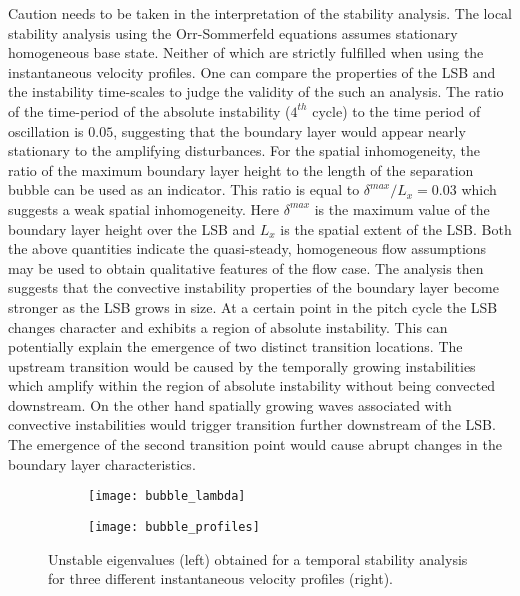 Caution needs to be taken in the interpretation of the stability analysis. The local stability analysis using the Orr-Sommerfeld equations assumes stationary homogeneous base state. Neither of which are strictly fulfilled when using the instantaneous velocity profiles. One can compare the properties of the LSB and the instability time-scales to judge the validity of the such an analysis. The ratio of the time-period of the absolute instability ($4^{th}$ cycle) to the time period of oscillation is $0.05$, suggesting that the boundary layer would appear nearly stationary to the amplifying disturbances. For the spatial inhomogeneity, the ratio of the maximum boundary layer height to the length of the separation bubble can be used as an indicator. This ratio is equal to $\delta^{max}/L_{x}=0.03$ which suggests a weak spatial inhomogeneity. Here $\delta^{max}$ is the maximum value of the boundary layer height over the LSB and $L_{x}$ is the spatial extent of the LSB. Both the above quantities indicate the quasi-steady, homogeneous flow assumptions may be used to obtain qualitative features of the flow case. The analysis then suggests that the convective instability properties of the boundary layer become stronger as the LSB grows in size. At a certain point in the pitch cycle the LSB changes character and exhibits a region of absolute instability. This can potentially explain the emergence of two distinct transition locations. The upstream transition would be caused by the temporally growing instabilities which amplify within the region of absolute instability without being convected downstream. On the other hand spatially growing waves associated with convective instabilities would trigger transition further downstream of the LSB. The emergence of the second transition point would cause abrupt changes in the boundary layer characteristics. 

\begin{figure}
	\centering
	\begin{subfigure}[t]{0.48\textwidth}
		\centering
		\texttt{[image: bubble\_lambda]}
	\end{subfigure}
	\begin{subfigure}[t]{0.48\textwidth}
		\centering
		\texttt{[image: bubble\_profiles]}
	\end{subfigure}
	\caption{Unstable eigenvalues (left) obtained for a temporal stability analysis for three different instantaneous velocity profiles (right). }
	\label{fig:bubble_lambda}
\end{figure}


